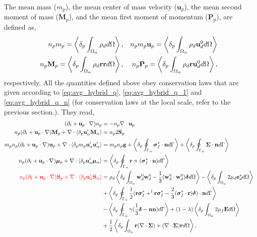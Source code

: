 The mean mass ($m_p$), the mean center of mass velocity ($\textbf{u}_p$), the mean second moment of mass ($\textbf{M}_p$), and the mean first moment of momentum ($\textbf{P}_p$), are defined as,
\begin{align}
    n_p m_p 
    =
    \left<\delta_{p} \int_{\Omega_{\alpha}} \rho_d d\Omega\right>,
    && n_p m_p \textbf{u}_p  
    =
    \left<\delta_{p} \int_{\Omega_{\alpha}} \rho_d \textbf{u}_d^0 d\Omega\right>\\
    n_p \textbf{M}_p  
    =
    \left<\delta_{p} \int_{\Omega_{\alpha}} \rho_d \textbf{rr}  d\Omega\right>,
    && n_p \textbf{P}_p  
    =
    \left<\delta_{p} \int_{\Omega_{\alpha}} \rho_d \textbf{r} \textbf{u}_d^0 d\Omega\right>,
\end{align} 
respectively.
All the quantities defined above obey conservation laws that are given according to \ref{eq:avg_hybrid_q}, \ref{eq:avg_hybrid_q_1} and \ref{eq:avg_hybrid_q_n} (for conservation laws at the local scale, refer to the previous section.).
They read, 
\begin{align}
    (\pddt + \textbf{u}_p \cdot \grad)n_p
    &=
    - n_p \div \textbf{u}_p\label{eq:mass_p}\\
    n_p (\pddt + \textbf{u}_p \cdot \grad) \textbf{M}_p
    +\div  \pavg{\textbf{u}_\alpha'\textbf{M}_\alpha}
    &=
    n_p2  \textbf{S}_p
    \label{eq:dt_hybrid_Mp}\\
    \label{eq:dt_hybrid_up}
    m_p n_p(\pddt + \textbf{u}_p \cdot \grad)\textbf{u}_p
    + \div \pavg{m_p \textbf{u}_\alpha'\textbf{u}_\alpha'}
    &=
    m_p n_p \textbf{g}
    + \pSavg{\bm\sigma_f^* \cdot \textbf{n}} + \pSavg{\bm\Sigma \cdot \textbf{n}}\\
    \label{eq:dt_hybrid_mup}
    n_p (\pddt + \textbf{u}_p \cdot \grad) \bm{\mu}_p
    +\div  \pavg{\textbf{u}_\alpha'\bm\mu_\alpha}
    &=
    \pSavg{\textbf{r}\times(\bm\sigma_f^*\cdot \textbf{n})}
    \\
    \label{eq:dt_hybrid_Sp}
    \color{red}
    n_p (\pddt + \textbf{u}_p \cdot \grad) \textbf{S}_p
    +\div  \pavg{\textbf{u}_\alpha'\textbf{S}_\alpha}
    &=
    \rho_d \pOavg{
        \textbf{w}_d^0  \textbf{w}_d^0 
        -\frac{1}{3} (\textbf{w}_d^0 \cdot  \textbf{w}_d^0) \bm\delta
    }
    - \pOavg{2 \mu_d\textbf{e}_d^*} \nonumber \\
    &+\pSavg{\frac{1}{2}(\textbf{r}\bm\sigma_f^*+^\dagger\textbf{r}\bm\sigma_f^*-\frac{2}{3}(\bm\sigma_f^* \cdot \textbf{r})\bm\delta)\cdot \textbf{n}}\nonumber\\
    &-  \pSavg{\gamma (\frac{1}{3}\bm\delta - \textbf{nn})}
     + (1-\lambda)\pOavg{2\mu_f\textbf{E}}\\
     &+ \frac{1}{2}\pOavg{\textbf{r}(\div\bm\Sigma)+ (\div\bm\Sigma) \textbf{r}},
\end{align}
